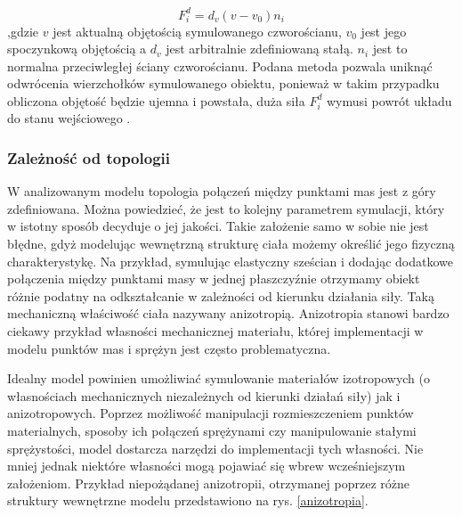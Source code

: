 \begin{equation}
F_i^d = d_v ( v - v_0) n_i
\end{equation}
,gdzie $v$ jest aktualną objętością symulowanego czworościanu, $v_0$ jest jego spoczynkową objętością a $d_v$ jest arbitralnie zdefiniowaną stałą. $n_i$ jest to normalna przeciwległej ściany czworościanu. Podana metoda pozwala uniknąć odwrócenia wierzchołków symulowanego obiektu, ponieważ w takim przypadku obliczona objętość będzie ujemna i powstała, duża siła $F_i^d$ wymusi powrót układu do stanu wejściowego \cite{isodb}.

\subsubsection{Zależność od topologii}
W analizowanym modelu topologia połączeń między punktami mas jest z góry zdefiniowana. Można powiedzieć, że jest to kolejny parametrem symulacji, który w istotny sposób decyduje o jej jakości. Takie założenie samo w sobie nie jest błędne, gdyż modelując wewnętrzną strukturę ciała możemy określić jego fizyczną charakterystykę. Na przykład, symulując elastyczny sześcian i dodając dodatkowe połączenia między punktami masy w jednej płaszczyźnie otrzymamy obiekt różnie podatny na odkształcanie w zależności od kierunku działania siły. Taką mechaniczną właściwość ciała nazywany anizotropią. Anizotropia stanowi bardzo ciekawy przykład własności mechanicznej materiału, której implementacji w modelu punktów mas i sprężyn jest często problematyczna. 

Idealny model powinien umożliwiać symulowanie materiałów izotropowych (o własnościach mechanicznych niezależnych od kierunki działań siły) jak i anizotropowych. Poprzez możliwość manipulacji rozmieszczeniem punktów materialnych, sposoby ich połączeń sprężynami czy manipulowanie stałymi sprężystości, model dostarcza narzędzi do implementacji tych własności. Nie mniej jednak niektóre własności mogą pojawiać się wbrew wcześniejszym założeniom. Przykład niepożądanej anizotropii, otrzymanej poprzez różne struktury wewnętrzne modelu przedstawiono na rys. \ref{anizotropia}.

